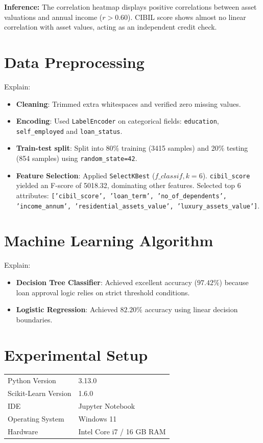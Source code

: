 \documentclass[12pt,a4paper]{article}
\begin{document}
\textbf{Inference:}
The correlation heatmap displays positive correlations between asset valuations and annual income ($r > 0.60$). CIBIL score shows almost no linear correlation with asset values, acting as an independent credit check.

\section{Data Preprocessing}

Explain:
\begin{itemize}
\item \textbf{Cleaning}: Trimmed extra whitespaces and verified zero missing values.
\item \textbf{Encoding}: Used \texttt{LabelEncoder} on categorical fields: \texttt{education}, \texttt{self\_employed} and \texttt{loan\_status}.
\item \textbf{Train-test split}: Split into 80\% training (3415 samples) and 20\% testing (854 samples) using \texttt{random\_state=42}.
\item \textbf{Feature Selection}: Applied \texttt{SelectKBest} ($f\_classif, k=6$). \texttt{cibil\_score} yielded an F-score of 5018.32, dominating other features. Selected top 6 attributes: \texttt{['cibil\_score', 'loan\_term', 'no\_of\_dependents', 'income\_annum', 'residential\_assets\_value', 'luxury\_assets\_value']}.
\end{itemize}

\section{Machine Learning Algorithm}

Explain:
\begin{itemize}
\item \textbf{Decision Tree Classifier}: Achieved excellent accuracy ($97.42\%$) because loan approval logic relies on strict threshold conditions.
\item \textbf{Logistic Regression}: Achieved $82.20\%$ accuracy using linear decision boundaries.
\end{itemize}

\section{Experimental Setup}

\begin{tabular}{ll}
\toprule
Python Version & 3.13.0 \\
Scikit-Learn Version & 1.6.0 \\
IDE & Jupyter Notebook \\
Operating System & Windows 11 \\
Hardware & Intel Core i7 / 16 GB RAM \\
\bottomrule
\end{tabular}
\end{document}
